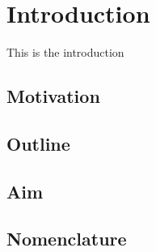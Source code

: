 %
%

\chapter{Introduction}\label{ch:introduction}

This is the introduction

\section{Motivation}\label{ch:introduction:motivation}
\section{Outline}\label{ch:introduction:outline}
\section{Aim}\label{ch:introduction:aim}
\section{Nomenclature}\label{ch:introduction:nomenclature}